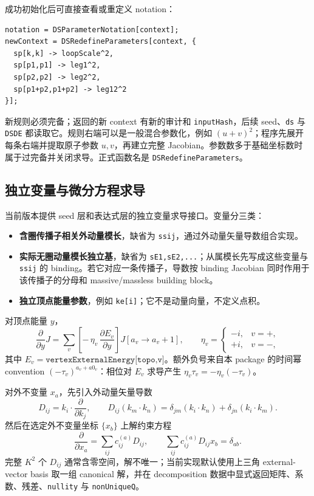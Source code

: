 ﻿\documentclass[a4paper,11pt]{article}
\begin{document}
成功初始化后可直接查看或重定义 notation：
\begin{verbatim}
notation = DSParameterNotation[context];
newContext = DSRedefineParameters[context, {
  sp[k,k] -> loopScale^2,
  sp[p1,p1] -> leg1^2,
  sp[p2,p2] -> leg2^2,
  sp[p1+p2,p1+p2] -> leg12^2
}];
\end{verbatim}
新规则必须完备；返回的新 context 有新的审计和 \texttt{inputHash}，后续 seed、\texttt{ds} 与 \texttt{DSDE} 都读取它。规则右端可以是一般混合参数化，例如 $(u+v)^2$；程序先展开每条右端并提取原子参数 $u,v$，再建立完整 Jacobian。参数数多于基础坐标数时属于过完备并关闭求导。正式函数名是 \texttt{DSRedefineParameters}。

\subsection{独立变量与微分方程求导}

当前版本提供 seed 层和表达式层的独立变量求导接口。变量分三类：
\begin{itemize}
  \item \textbf{含圈传播子相关外动量模长}，缺省为 \texttt{ssij}，通过外动量矢量导数组合实现。
  \item \textbf{实际无圈动量模长独立基}，缺省为 \texttt{sE1,sE2,...}；从属模长先写成这些变量与 \texttt{ssij} 的 binding。若它对应一条传播子，导数按 binding Jacobian 同时作用于该传播子的分母和 massive/massless building block。
  \item \textbf{独立顶点能量参数}，例如 \texttt{ke[i]}；它不是动量向量，不定义点积。
\end{itemize}

对顶点能量 $y$，
\begin{equation}
 \frac{\partial}{\partial y}J
 =\sum_v
 \left[-\,\eta_v\,\frac{\partial E_v}{\partial y}\right]
 J[a_v\to a_v+1],
 \qquad
 \eta_v=
 \begin{cases}
 -i,&v=+,\\
 +i,&v=-,
 \end{cases}
\end{equation}
其中 $E_v=\texttt{vertexExternalEnergy[topo,v]}$。额外负号来自本 package 的时间幂 convention
$(-\tau_v)^{a_v+a0_v}$：相位对 $E_v$ 求导产生 $\eta_v\tau_v=-\eta_v(-\tau_v)$。

对外不变量 $x_a$，先引入外动量矢量导数
\begin{equation}
 D_{ij}=k_i\cdot\frac{\partial}{\partial k_j},
 \qquad
 D_{ij}(k_m\cdot k_n)
 =\delta_{jm}(k_i\cdot k_n)+\delta_{jn}(k_i\cdot k_m).
\end{equation}
然后在选定外不变量坐标 $\{x_b\}$ 上解约束方程
\begin{equation}
 \frac{\partial}{\partial x_a}
 =\sum_{ij}c^{(a)}_{ij}D_{ij},
 \qquad
 \sum_{ij}c^{(a)}_{ij}D_{ij}x_b=\delta_{ab}.
\end{equation}
完整 $K^2$ 个 $D_{ij}$ 通常含零空间，解不唯一；当前实现默认使用上三角 external-vector basis 取一组 canonical 解，并在 decomposition 数据中显式返回矩阵、系数、残差、\texttt{nullity} 与 \texttt{nonUniqueQ}。
\end{document}
